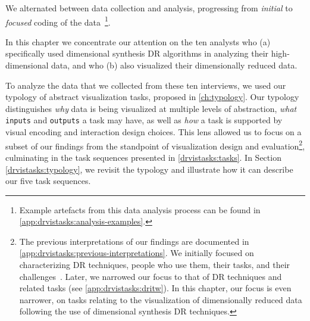 We alternated between data collection and analysis, progressing from {\it initial} to {\it focused} coding of the data~\cite{Charmaz2006}\footnote{Example artefacts from this data analysis process can be found in \autoref{app:drvistasks:analysis-examples}.}.

In this chapter we concentrate our attention on the ten analysts who (a) specifically used dimensional synthesis \ac{DR} algorithms in analyzing their high-dimensional data, and who (b) also visualized their dimensionally reduced data.

To analyze the data that we collected from these ten interviews, we used our typology of abstract visualization tasks, proposed in \autoref{ch:typology}.
Our typology distinguishes {\it why} data is being visualized at multiple levels of abstraction, {\it what} {\tt inputs} and {\tt outputs} a task may have, as well as {\it how} a task is supported by visual encoding and interaction design choices. 
This lens allowed us to focus on a subset of our findings from the standpoint of visualization design and evaluation\footnote{The previous interpretations of our findings are documented in \autoref{app:drvistasks:previous-interpretations}. We initially focused on characterizing \ac{DR} techniques, people who use them, their tasks, and their challenges~\cite{Sedlmair2012b}. 
Later, we narrowed our focus to that of \ac{DR} techniques and related tasks (see \autoref{app:drvistasks:dritw}). 
In this chapter, our focus is even narrower, on tasks relating to the visualization of dimensionally reduced data following the use of dimensional synthesis \ac{DR} techniques.}, culminating in the task sequences presented in \autoref{drvistasks:tasks}.
In Section \ref{drvistasks:typology}, we revisit the typology and illustrate how it can describe our five task sequences. 

